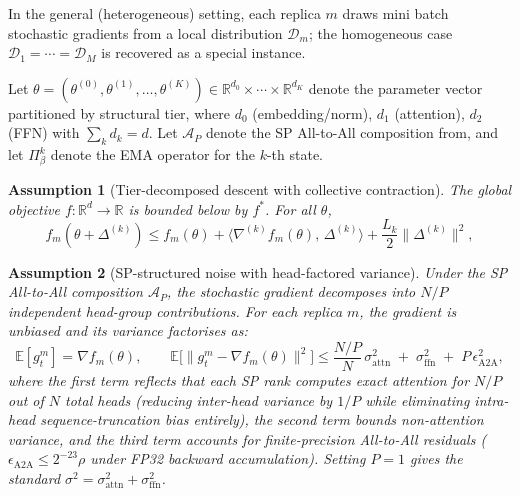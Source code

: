 \documentclass{article}
\newtheorem{assumption}{Assumption}[section]
\begin{document}
In the general (heterogeneous) setting, each replica $m$ draws mini batch
stochastic gradients from a local distribution $\mathcal{D}_m$; the
homogeneous case $\mathcal{D}_1 = \cdots = \mathcal{D}_M$ is recovered as a
special instance.



Let $\theta = (\theta^{(0)}, \theta^{(1)}, \ldots, \theta^{(K)}) \in
\mathbb{R}^{d_0} \times \cdots \times \mathbb{R}^{d_K}$ denote the
parameter vector partitioned by structural tier, where
$d_0$ (embedding/norm), $d_1$ (attention), $d_2$ (FFN) with
$\sum_k d_k = d$. Let $\mathcal{A}_P$ denote the SP All-to-All
composition from, and let
$\Pi_\beta^k$ denote the EMA operator for the $k$-th state.

\begin{assumption}[Tier-decomposed descent with collective contraction]
\label{asm:smooth}
The global objective $f\!:\mathbb{R}^d\!\to\!\mathbb{R}$ is bounded below
by $f^*$. For all $\theta$,
\begin{equation}
f_m(\theta + \Delta^{(k)}) \leq f_m(\theta)
+ \langle \nabla^{(k)} f_m(\theta),\, \Delta^{(k)} \rangle
+ \frac{L_k}{2}\|\Delta^{(k)}\|^2,
\end{equation}
\end{assumption}

\begin{assumption}[SP-structured noise with head-factored variance]
\label{asm:noise}
Under the SP All-to-All composition $\mathcal{A}_P$, the stochastic
gradient decomposes into $N/P$ independent head-group contributions.
For each replica $m$, the gradient is unbiased and its variance
factorises as:
\begin{equation}
\mathbb{E}[g_t^m] = \nabla f_m(\theta), \qquad
\mathbb{E}\bigl[\|g_t^m - \nabla f_m(\theta)\|^2\bigr]
\leq
\frac{N/P}{N}\,\sigma_{\mathrm{attn}}^2
\;+\;
\sigma_{\mathrm{ffn}}^2
\;+\;
P\,\epsilon_{\mathrm{A2A}}^2,
\end{equation}
where the first term reflects that each SP rank computes exact attention
for $N/P$ out of $N$ total heads (reducing inter-head variance by $1/P$
while eliminating intra-head sequence-truncation bias entirely), the
second term bounds non-attention variance, and the third term accounts for
finite-precision All-to-All residuals ($\epsilon_{\mathrm{A2A}} \leq
2^{-23}\rho$ under FP32 backward accumulation). Setting $P{=}1$ gives
the standard $\sigma^2 = \sigma_{\mathrm{attn}}^2 + \sigma_{\mathrm{ffn}}^2$.
\end{assumption}
\end{document}
